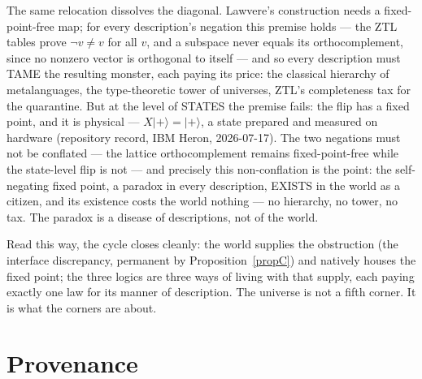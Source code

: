 \documentclass[11pt]{article}
\theoremstyle{remark}
\begin{document}
The same relocation dissolves the diagonal. Lawvere's construction needs a
fixed-point-free map; for every description's negation this premise holds
--- the ZTL tables prove $\neg v \neq v$ for all $v$, and a subspace never
equals its orthocomplement, since no nonzero vector is orthogonal to itself
--- and so every description must TAME the resulting monster, each paying
its price: the classical hierarchy of metalanguages, the type-theoretic
tower of universes, ZTL's completeness tax for the quarantine. But at the
level of STATES the premise fails: the flip has a fixed point, and it is
physical --- $X\lvert{+}\rangle = \lvert{+}\rangle$, a state prepared and
measured on hardware (repository record, IBM Heron, 2026-07-17). The two
negations must not be conflated --- the lattice orthocomplement remains
fixed-point-free while the state-level flip is not --- and precisely this
non-conflation is the point: the self-negating fixed point, a paradox in
every description, EXISTS in the world as a citizen, and its existence costs
the world nothing --- no hierarchy, no tower, no tax. The paradox is a
disease of descriptions, not of the world.

Read this way, the cycle closes cleanly: the world supplies the obstruction
(the interface discrepancy, permanent by Proposition~\ref{propC}) and
natively houses the fixed point; the three logics are three ways of living
with that supply, each paying exactly one law for its manner of description.
The universe is not a fifth corner. It is what the corners are about.

\section{Provenance}\label{sec:prov}
\end{document}
